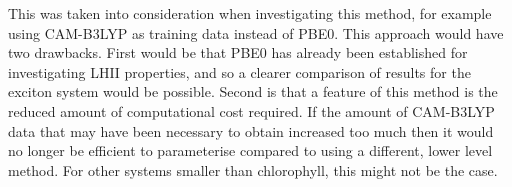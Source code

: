 This was taken into consideration when investigating this method,
for example using CAM-B3LYP as training data instead of PBE0. This approach would
have two drawbacks. First would be that PBE0 has already been established for investigating
LHII properties, and so a clearer comparison of results for the exciton system would
be possible. Second is that a feature of this method is the reduced amount of 
computational cost required. If the amount of CAM-B3LYP data that may have been 
necessary to obtain increased too much then it would no longer be efficient to 
parameterise compared to using a different, lower level method. For other systems
smaller than chlorophyll, this might not be the case.
